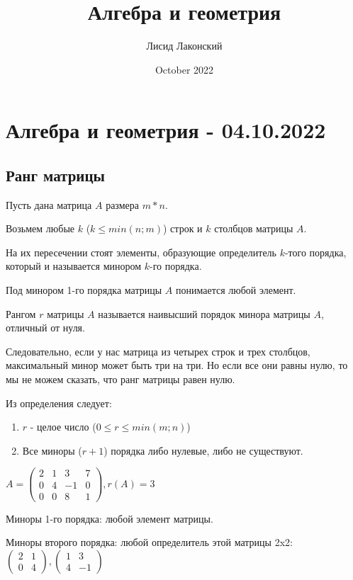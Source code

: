 \documentclass{article}
\title{Алгебра и геометрия}
\author{Лисид Лаконский}
\date{October 2022}
\begin{document}
\maketitle

\tableofcontents
\pagebreak


\section{Алгебра и геометрия - 04.10.2022}

\subsection{Ранг матрицы}

Пусть дана матрица $A$ размера $m * n$.

Возьмем любые $k$ ($k \le min(n;m)$) строк и $k$ столбцов матрицы $A$.

На их пересечении стоят элементы, образующие определитель $k$-того порядка, который и называется минором $k$-го порядка.

Под минором 1-го порядка матрицы $A$ понимается любой элемент.

Рангом $r$ матрицы $A$ называется наивысший порядок минора матрицы $A$, отличный от нуля.

Следовательно, если у нас матрица из четырех строк и трех столбцов, максимальный минор может быть три на три. Но если все они равны нулю, то мы не можем сказать, что ранг матрицы равен нулю.

Из определения следует:

\begin{enumerate}
    \item $r$ - целое число ($0 \le r \le min(m;n)$)
    \item Все миноры ($r + 1$) порядка либо нулевые, либо не существуют. 
\end{enumerate}

$A = \begin{pmatrix}
    2 & 1 & 3 & 7 \\
    0 & 4 & -1 & 0 \\
    0 & 0 & 8 & 1
\end{pmatrix}, r(A) = 3$

Миноры 1-го порядка: любой элемент матрицы. 

Миноры второго порядка: любой определитель этой матрицы 2x2: $\begin{pmatrix} 2 & 1 \\ 0 & 4 \end{pmatrix}, \begin{pmatrix} 1 & 3 \\ 4 & -1 \end{pmatrix}$
\end{document}
